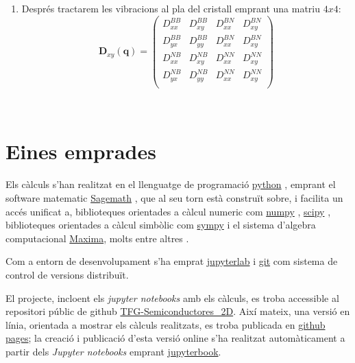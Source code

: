\documentclass[12pt]{article} %
\let\vec\mathbf %
\begin{document}
{\begin{enumerate}
 \item Després tractarem les vibracions al pla del cristall emprant una matriu $4x4$:
 \begin{equation}
  \vec D_{xy}(\vec q)=
  \begin{pmatrix}
   D_{xx}^{BB} & D_{xy}^{BB} & D_{xx}^{BN} & D_{xy}^{BN}  \\
   D_{yx}^{BB} & D_{yy}^{BB} & D_{xx}^{BN} & D_{xy}^{BN}  \\
   D_{xx}^{NB} & D_{xy}^{NB} & D_{xx}^{NN} & D_{xy}^{NN} \\
   D_{yx}^{NB} & D_{yy}^{NB} & D_{xx}^{NN} & D_{xy}^{NN} \\
  \end{pmatrix}
\end{equation}

\end{enumerate}


 


\


\newpage
\section{Eines emprades}

Els càlculs s'han realitzat en el llenguatge de programació \href{https://www.python.org/}{python} \cite{4160250}, emprant el software matematic \href{https://www.sagemath.org/}{Sagemath} \cite{sagemath}, que al seu torn està construït sobre, i facilita un accés unificat a, biblioteques orientades a càlcul numeric com \href{https://numpy.org/}{numpy} \cite{harris2020array} , \href{https://scipy.org/}{scipy} \cite{2020SciPy-NMeth}, biblioteques orientades a càlcul simbòlic com \href{https://www.sympy.org/}{sympy} i el sistema d'algebra computacional \href{https://maxima.sourceforge.io/}{Maxima}, molts entre altres . 

Com a entorn de desenvolupament s'ha emprat \href{https://jupyter.org/}{jupyterlab} i \href{https://git-scm.com/}{git} com sistema de control de versions distribuït. 

El projecte, incloent els \textit{\foreignlanguage{english}{jupyter notebooks}} amb els càlculs, es troba accessible al repositori públic de github \href{https://github.com/CasimirVictoria/TFG-Semiconductores\_2D}{TFG-Semiconductores\_2D}. Així mateix, una versió en línia, orientada a mostrar els càlculs realitzats, es troba publicada en \href{https://casimirvictoria.github.io/TFG-Semiconductores_2D/index.html}{github pages}; la creació i publicació d'esta versió online s'ha realitzat automàticament a partir dels \textit{Jupyter notebooks} emprant \href{https://jupyterbook.org/intro.html}{jupyterbook}.

}
\end{document}
